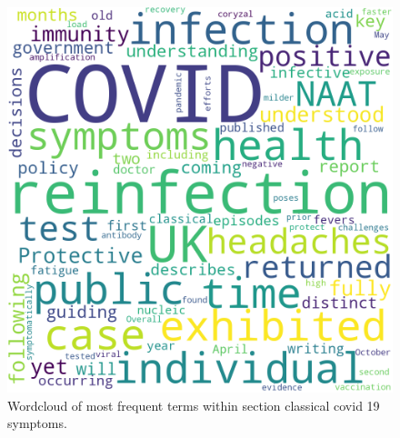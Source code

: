 \documentclass{qqtarticle}
\begin{document}
    \begin{figure}[H]
        \centering
        \includegraphics[width=.75\linewidth]{img/classicalcovid19symptoms.png}
        \caption{Wordcloud of most frequent terms within section classical covid 19 symptoms.}
        \label{fig:wcl_classicalcovid19symptoms}
    \end{figure}
\end{document}
